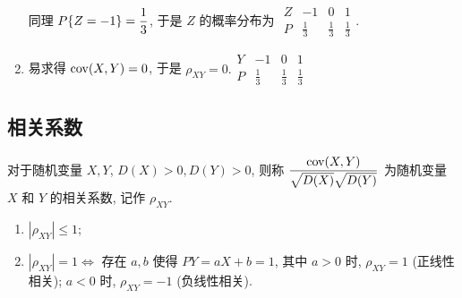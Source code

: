 \begin{solution}
\begin{minipage}{0.68\linewidth}
\begin{enumerate}[label=(\arabic{*})]
            同理 $P\qty{Z=-1}=\dfrac{1}{3}$, 于是 $Z$ 的概率分布为 $\begin{array}{c|ccc}
                Z & -1          & 0           & 1           \\\hline
                P & \frac{1}{3} & \frac{1}{3} & \frac{1}{3}
            \end{array}.$
            \item 易求得 $\mathrm{cov}(X,Y)=0$, 于是 $\rho_{XY}=0.\begin{array}{c|ccc}
                Y & -1          & 0           & 1           \\\hline
                P & \frac{1}{3} & \frac{1}{3} & \frac{1}{3}
            \end{array}$
        \end{enumerate}
    \end{minipage}
\end{solution}

\subsection{相关系数}

\begin{definition}[相关系数]
    对于随机变量 $X,Y$, $D(X)>0,D(Y)>0$, 则称 $\dfrac{\mathrm{cov}(X,Y)}{\sqrt{D(X)}\sqrt{D(Y)}}$ 为随机变量 $X$ 和 $Y$ 的相关系数, 记作 $\rho_{XY}$.
\end{definition}

\begin{theorem}[相关系数的性质]
    \begin{enumerate}[label=(\arabic{*})]
        \item $|\rho_{XY}|\leqslant 1$;
        \item $|\rho_{XY}|=1\Leftrightarrow $ 存在 $a,b$ 使得 $P{Y=aX+b}=1$, 其中 $a>0$ 时, $\rho_{XY}=1$ (正线性相关); $a<0$ 时, $\rho_{XY}=-1$ (负线性相关).
    \end{enumerate}
\end{theorem}

